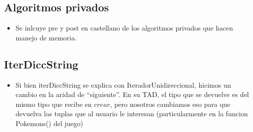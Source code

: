 \subsection{Algoritmos privados}

\begin{itemize}

\item{Se inlcuye pre y post en castellano de los algoritmos privados que hacen manejo de memoria.}

\end{itemize}


\subsection{IterDiccString}

\begin{itemize}

\item{Si bien iterDiccString se explica con IteradorUnidireccional, hicimos un cambio en la aridad de ``siguiente''. En su TAD, el tipo que se devuelve es del mismo tipo que recibe en $crear$, pero nosotros cambiamos eso para que devuelva las tuplas que al usuario le interesan (particularmente en la funcion Pokemons() del juego)}

\end{itemize}


